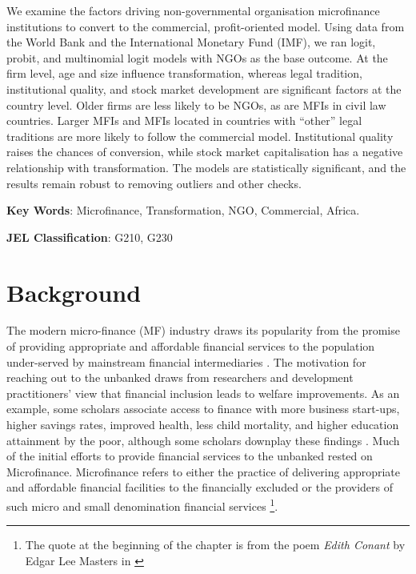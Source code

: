 \documentclass[a4paper, nobind]{templates/ociamthesis}
\begin{document}
We examine the factors driving non-governmental organisation microfinance institutions to convert to the commercial, profit-oriented model. Using data from the World Bank and the International Monetary Fund (IMF), we ran logit, probit, and multinomial logit models with NGOs as the base outcome. At the firm level, age and size influence transformation, whereas legal tradition, institutional quality, and stock market development are significant factors at the country level. Older firms are less likely to be NGOs, as are MFIs in civil law countries. Larger MFIs and MFIs located in countries with ``other'' legal traditions are more likely to follow the commercial model. Institutional quality raises the chances of conversion, while stock market capitalisation has a negative relationship with transformation. The models are statistically significant, and the results remain robust to removing outliers and other checks.

\vspace{10mm}

\textbf{Key Words}: Microfinance, Transformation, NGO, Commercial, Africa.

\vspace{5mm}

\textbf{JEL Classification}: G210, G230

\newpage

\hypertarget{background}{%
\section{Background}\label{background}}

The modern micro-finance (MF) industry draws its popularity from the promise of providing appropriate and affordable financial services to the population under-served by mainstream financial intermediaries \autocite{morduch1999microfinance,morduch2000microfinance}. The motivation for reaching out to the unbanked draws from researchers and development practitioners' view that financial inclusion leads to welfare improvements. As an example, some scholars associate access to finance with more business start-ups, higher savings rates, improved health, less child mortality, and higher education attainment by the poor, although some scholars downplay these findings \autocite{klapper2015role,o2017systematic,shahriar2017lender}. Much of the initial efforts to provide financial services to the unbanked rested on Microfinance. Microfinance refers to either the practice of delivering appropriate and affordable financial facilities to the financially excluded or the providers of such micro and small denomination financial services \autocite{ledgerwood2006transforming} \footnote{The quote at the beginning of the chapter is from the poem \emph{Edith Conant} by Edgar Lee Masters in \textcite{masters2007spoon}}.
\end{document}
